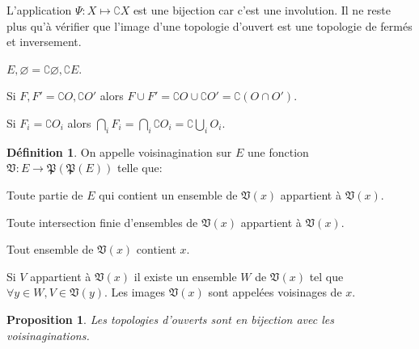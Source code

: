 \documentclass[a4paper, 11pt, french]{book}
\newenvironment{itemise}{\itemize}{\enditemize}
\theoremstyle{plain} %
\newtheorem{proposition}{Proposition}
\theoremstyle{definition} %
\newtheorem{definition}{Définition}
\theoremstyle{remark} %
\newcommand{\1}{\mathds{1}}
\newcommand\vide{\varnothing}
\begin{document}
L'application $\Psi:X\longmapsto\complement X$ est une bijection car c'est une involution.
Il ne reste plus qu'à vérifier que l'image d'une topologie d'ouvert est une topologie de fermés et inversement.
\begin{itemise}
	\item $E, \vide=\complement\vide, \complement E$.
	\item Si $F, F'=\complement O, \complement O'$ alors $F\cup F'=\complement O\cup\complement O'=\complement(O\cap O')$.
	\item Si $F_i=\complement O_i$ alors $\bigcap_iF_i=\bigcap_i\complement O_i=\complement\bigcup_iO_i$.
\end{itemise}

\begin{definition}
	On appelle voisinagination sur $E$ une fonction $\mathfrak{V}:E\rightarrow\mathfrak{P}(\mathfrak{P}(E))$ telle que:
	\begin{itemise}
		\item Toute partie de $E$ qui contient un ensemble de $\mathfrak{V}(x)$ appartient à $\mathfrak{V}(x)$.
		\item Toute intersection finie d'ensembles de $\mathfrak{V}(x)$ appartient à $\mathfrak{V}(x)$.
		\item Tout ensemble de $\mathfrak{V}(x)$ contient $x$.
		\item Si $V$ appartient à $\mathfrak{V}(x)$ il existe un ensemble $W$ de $\mathfrak{V}(x)$ tel que $\forall y\in W, V\in\mathfrak{V}(y)$.
	\end{itemise}
	Les images $\mathfrak{V}(x)$ sont appelées voisinages de $x$.
\end{definition}

\begin{proposition}
	Les topologies d'ouverts sont en bijection avec les voisinaginations.
\end{proposition}
\end{document}
